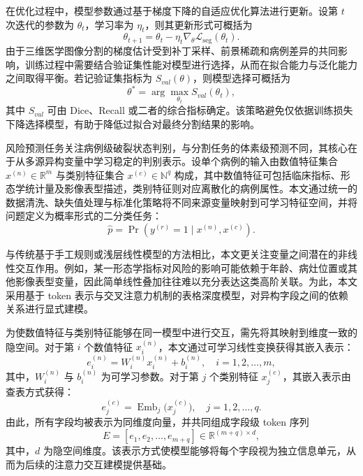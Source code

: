 在优化过程中，模型参数通过基于梯度下降的自适应优化算法进行更新。设第 $t$ 次迭代的参数为 $\theta_t$，学习率为 $\eta_t$，则其更新形式可概括为
\begin{equation}
\theta_{t+1}=\theta_t-\eta_t\nabla_{\theta}\mathcal{L}_{\mathrm{seg}}(\theta_t).
\end{equation}
由于三维医学图像分割的梯度估计受到补丁采样、前景稀疏和病例差异的共同影响，训练过程中需要结合验证集性能对模型进行选择，从而在拟合能力与泛化能力之间取得平衡。若记验证集指标为 $S_{val}(\theta)$，则模型选择可概括为
\begin{equation}
\theta^{\ast}=\arg\max_{\theta_t}S_{val}(\theta_t),
\end{equation}
其中 $S_{val}$ 可由 Dice、Recall 或二者的综合指标确定。该策略避免仅依据训练损失下降选择模型，有助于降低过拟合对最终分割结果的影响。

风险预测任务关注病例级破裂状态判别，与分割任务的体素级预测不同，其核心在于从多源异构变量中学习稳定的判别表示。设单个病例的输入由数值特征集合 $x^{(n)}\in\mathbb{R}^{m}$ 与类别特征集合 $x^{(c)}\in\mathbb{N}^{q}$ 构成，其中数值特征可包括临床指标、形态学统计量及影像表型描述，类别特征则对应离散化的病例属性。本文通过统一的数据清洗、缺失值处理与标准化策略将不同来源变量映射到可学习特征空间，并将问题定义为概率形式的二分类任务：
\begin{equation}
\hat{p}=\Pr(y^{(r)}=1\mid x^{(n)},x^{(c)}).
\end{equation}

与传统基于手工规则或浅层线性模型的方法相比，本文更关注变量之间潜在的非线性交互作用。例如，某一形态学指标对风险的影响可能依赖于年龄、病灶位置或其他影像表型变量，因此简单线性叠加往往难以充分表达这类高阶关联。为此，本文采用基于 token 表示与交叉注意力机制的表格深度模型，对异构字段之间的依赖关系进行显式建模。

为使数值特征与类别特征能够在同一模型中进行交互，需先将其映射到维度一致的隐空间。对于第 $i$ 个数值特征 $x_i^{(n)}$，本文通过可学习线性变换获得其嵌入表示：
\begin{equation}
e_i^{(n)} = W_i^{(n)} x_i^{(n)} + b_i^{(n)}, \quad i=1,2,\ldots,m,
\end{equation}
其中，$W_i^{(n)}$ 与 $b_i^{(n)}$ 为可学习参数。对于第 $j$ 个类别特征 $x_j^{(c)}$，其嵌入表示由查表方式获得：
\begin{equation}
e_j^{(c)} = \operatorname{Emb}_j\bigl(x_j^{(c)}\bigr), \quad j=1,2,\ldots,q.
\end{equation}
由此，所有字段均被表示为同维度向量，并共同组成字段级 token 序列
\begin{equation}
E = [e_1,e_2,\ldots,e_{m+q}]\in\mathbb{R}^{(m+q)\times d},
\end{equation}
其中，$d$ 为隐空间维度。该表示方式使模型能够将每个字段视为独立信息单元，从而为后续的注意力交互建模提供基础。

